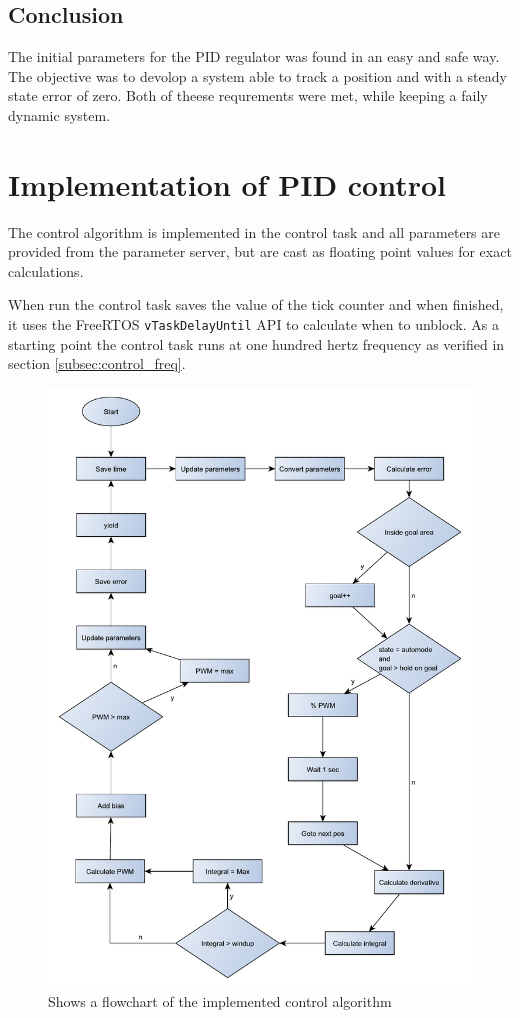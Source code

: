 \subsection{Conclusion}
The initial parameters for the PID regulator was found in an easy and safe way. The objective was to devolop a system able to track a position and with a steady state error of zero. Both of theese requrements were met, while keeping a faily dynamic system.


\section{Implementation of PID control}
The control algorithm is implemented in the control task and all parameters are provided from the parameter server, but are cast as  floating point values for exact calculations.

When run the control task saves the value of the tick counter and when finished, it uses the FreeRTOS \texttt{vTaskDelayUntil} API to calculate when to unblock. As a starting point the control task runs at one hundred hertz frequency as verified in section \ref{subsec:control_freq}.

\begin{figure}[htb]
	\centering
	\includegraphics[width=\textwidth,trim=0 0 0 0]{graphics/control_alg_diagram.pdf}
	\caption{Shows a flowchart of the implemented control algorithm}
	\label{fig:pid_flow}			
\end{figure}

